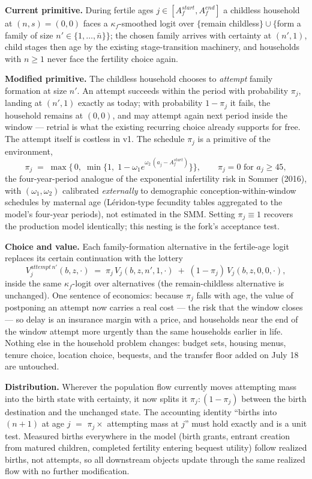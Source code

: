 \documentclass[11pt]{article}
\newcommand{\Vb}{V}
\begin{document}
\textbf{Current primitive.} During fertile ages $j \in [A_f^{start},
A_f^{end}]$ a childless household at $(n,s)=(0,0)$ faces a
$\kappa_f$-smoothed logit over $\{$remain childless$\} \cup \{$form a family
of size $n'\in\{1,\dots,\bar n\}\}$; the chosen family arrives with
certainty at $(n',1)$, child stages then age by the existing
stage-transition machinery, and households with $n\ge 1$ never face the
fertility choice again.

\textbf{Modified primitive.} The childless household chooses to
\emph{attempt} family formation at size $n'$. An attempt succeeds within the
period with probability $\pi_j$, landing at $(n',1)$ exactly as today;
with probability $1-\pi_j$ it fails, the household remains at $(0,0)$, and
may attempt again next period inside the window --- retrial is what the
existing recurring choice already supports for free. The attempt itself is
costless in v1. The schedule $\pi_j$ is a primitive of the environment,
\[
  \pi_j \;=\; \max\bigl\{\,0,\;\min\{1,\;1-\omega_1 e^{\omega_2\,(a_j -
  A_f^{start})}\}\bigr\},
  \qquad \pi_j = 0 \text{ for } a_j \ge 45,
\]
the four-year-period analogue of the exponential infertility risk in Sommer
(2016), with $(\omega_1,\omega_2)$ calibrated \emph{externally} to
demographic conception-within-window schedules by maternal age
(L\'eridon-type fecundity tables aggregated to the model's four-year
periods), not estimated in the SMM. Setting $\pi_j \equiv 1$ recovers the
production model identically; this nesting is the fork's acceptance test.

\textbf{Choice and value.} Each family-formation alternative in the
fertile-age logit replaces its certain continuation with the lottery
\[
  \Vb^{attempt\,n'}_j(b,z,\cdot) \;=\; \pi_j\,\Vb_j(b,z,n',1,\cdot)
  \;+\; (1-\pi_j)\,\Vb_j(b,z,0,0,\cdot),
\]
inside the same $\kappa_f$-logit over alternatives (the remain-childless
alternative is unchanged). One sentence of
economics: because $\pi_j$ falls with age, the value of postponing an
attempt now carries a real cost --- the risk that the window closes --- so
delay is an insurance margin with a price, and households near the end of
the window attempt more urgently than the same households earlier in life.
Nothing else in the household problem changes: budget sets, housing menus,
tenure choice, location choice, bequests, and the transfer floor added on
July 18 are untouched.

\textbf{Distribution.} Wherever the population flow currently moves
attempting mass into the birth state with certainty, it now splits it
$\pi_j : (1-\pi_j)$ between the birth destination and the unchanged state.
The accounting identity ``births into $(n+1)$ at age $j$ $=$ $\pi_j \times$
attempting mass at $j$'' must hold exactly and is a unit test. Measured
births everywhere in the model (birth grants, entrant creation from matured
children, completed fertility entering bequest utility) follow realized
births, not attempts, so all downstream objects update through the same
realized flow with no further modification.
\end{document}
